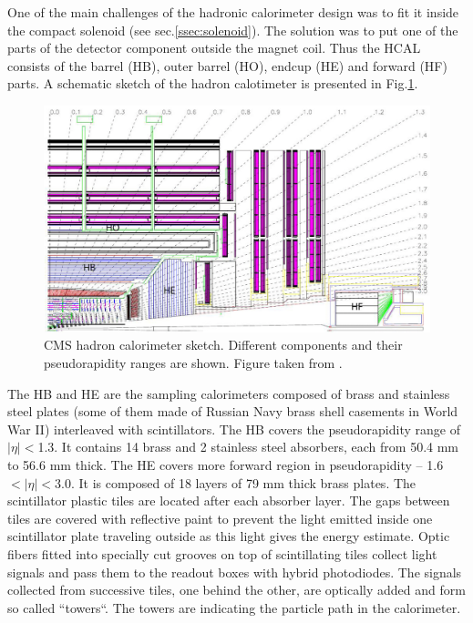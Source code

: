 One of the main challenges of the hadronic calorimeter design was to fit it inside the compact solenoid (see sec.\ref{ssec:solenoid}).
The solution was to put one of the parts of the detector component outside the magnet coil. Thus the HCAL consists of the barrel (HB), 
outer barrel (HO), endcup (HE) and forward (HF) parts. A schematic sketch of the hadron calotimeter is presented in Fig.\ref{fig:hcal}.

\begin{figure}[t]
  \centering
  \includegraphics[width=1.0\textwidth]{02_experimental_setup/plots/Figures_Experimental_Apparatus_HCAL.png}
  \caption{CMS hadron calorimeter sketch. Different components and their pseudorapidity ranges are shown. Figure taken from \cite{XDAQ}.}
  \label{fig:hcal}
\end{figure}

The HB and HE are the sampling calorimeters composed of brass and stainless steel plates (some of them made of Russian Navy brass 
shell casements in World War II) interleaved with scintillators. The HB covers the pseudorapidity range of $|\eta| < $1.3. It contains 14 brass and
2 stainless steel absorbers, each from 50.4 mm to 56.6 mm thick. The HE covers more forward region in pseudorapidity -- 1.6$ < |\eta| < $3.0. It is composed
of 18 layers of 79 mm thick brass plates. The scintillator plastic tiles are located after each absorber layer. The gaps between tiles are covered 
with reflective paint to prevent the light emitted inside one scintillator plate traveling outside as this light gives the energy estimate. Optic fibers fitted into
specially cut grooves on top of scintillating tiles collect light signals and pass them to the readout boxes with hybrid photodiodes. The signals
collected from successive tiles, one behind the other, are optically added and form so called ``towers``. The towers are indicating 
the particle path in the calorimeter.

